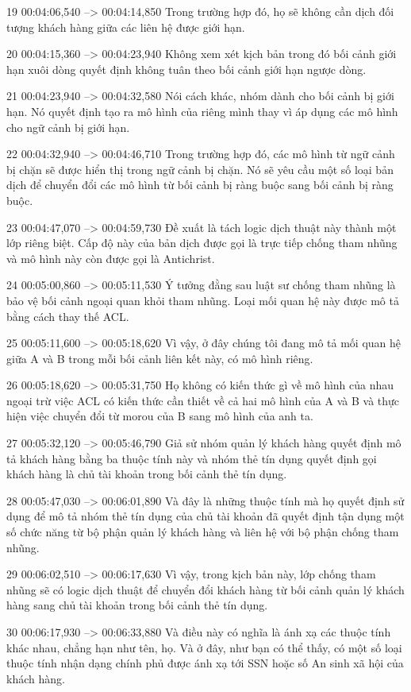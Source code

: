 19
00:04:06,540 --> 00:04:14,850
Trong trường hợp đó, họ sẽ không cần dịch đối tượng khách hàng giữa các liên hệ được giới hạn.

20
00:04:15,360 --> 00:04:23,940
Không xem xét kịch bản trong đó bối cảnh giới hạn xuôi dòng quyết định không tuân theo bối cảnh giới hạn ngược dòng.

21
00:04:23,940 --> 00:04:32,580
Nói cách khác, nhóm dành cho bối cảnh bị giới hạn.  Nó quyết định tạo ra mô hình của riêng mình thay vì áp dụng các mô hình cho ngữ cảnh bị giới hạn.

22
00:04:32,940 --> 00:04:46,710
Trong trường hợp đó, các mô hình từ ngữ cảnh bị chặn sẽ được hiển thị trong ngữ cảnh bị chặn.  Nó sẽ yêu cầu một số loại bản dịch để chuyển đổi các mô hình từ bối cảnh bị ràng buộc sang bối cảnh bị ràng buộc.

23
00:04:47,070 --> 00:04:59,730
Đề xuất là tách logic dịch thuật này thành một lớp riêng biệt.  Cấp độ này của bản dịch được gọi là trực tiếp chống tham nhũng và mô hình này còn được gọi là Antichrist.

24
00:05:00,860 --> 00:05:11,530
Ý tưởng đằng sau luật sư chống tham nhũng là bảo vệ bối cảnh ngoại quan khỏi tham nhũng.  Loại mối quan hệ này được mô tả bằng cách thay thế ACL.

25
00:05:11,600 --> 00:05:18,620
Vì vậy, ở đây chúng tôi đang mô tả mối quan hệ giữa A và B trong mỗi bối cảnh liên kết này, có mô hình riêng.

26
00:05:18,620 --> 00:05:31,750
Họ không có kiến ​​thức gì về mô hình của nhau ngoại trừ việc ACL có kiến ​​thức cần thiết về cả hai mô hình của A và B và thực hiện việc chuyển đổi từ morou của B sang mô hình của anh ta.

27
00:05:32,120 --> 00:05:46,790
Giả sử nhóm quản lý khách hàng quyết định mô tả khách hàng bằng ba thuộc tính này và nhóm thẻ tín dụng quyết định gọi khách hàng là chủ tài khoản trong bối cảnh thẻ tín dụng.

28
00:05:47,030 --> 00:06:01,890
Và đây là những thuộc tính mà họ quyết định sử dụng để mô tả nhóm thẻ tín dụng của chủ tài khoản đã quyết định tận dụng một số chức năng từ bộ phận quản lý khách hàng và liên hệ với bộ phận chống tham nhũng.

29
00:06:02,510 --> 00:06:17,630
Vì vậy, trong kịch bản này, lớp chống tham nhũng sẽ có logic dịch thuật để chuyển đổi khách hàng từ bối cảnh quản lý khách hàng sang chủ tài khoản trong bối cảnh thẻ tín dụng.

30
00:06:17,930 --> 00:06:33,880
Và điều này có nghĩa là ánh xạ các thuộc tính khác nhau, chẳng hạn như tên, họ.  Và ở đây, như bạn có thể thấy, có một số loại thuộc tính nhận dạng chính phủ được ánh xạ tới SSN hoặc số An sinh xã hội của khách hàng.

